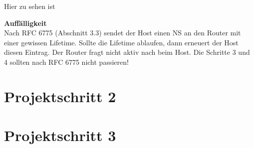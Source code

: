 \documentclass[]{scrartcl}
\begin{document}
Hier zu sehen ist

\textbf{Auffälligkeit}\\
Nach RFC 6775 (Abschnitt 3.3) sendet der Host einen NS an den Router mit einer gewissen Lifetime. Sollte die Lifetime ablaufen, dann erneuert der Host diesen Eintrag. Der Router fragt nicht aktiv nach beim Host. Die Schritte 3 und 4 sollten nach RFC 6775 nicht passieren!


\section{Projektschritt 2}

\section{Projektschritt 3}
\end{document}
